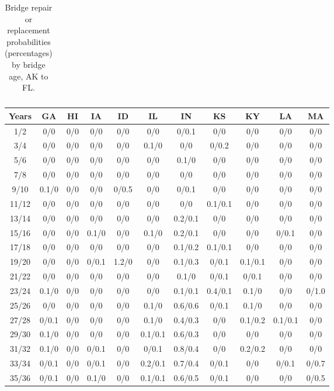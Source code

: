 \begin{table*}[htb]
\begin{tabular}{|c| c c c c c c c c c c |}
    \end{tabular}
    \caption{Bridge repair or replacement probabilities (percentages) by bridge age, AK to FL.}
    \label{table:states0}
\end{table*}
    

\begin{table*}[htb]
\footnotesize
    \centering
    \begin{tabular}{|c| c c c c c c c c c c |}\hline
        \textbf{Years} & \textbf{GA}& \textbf{HI}& \textbf{IA}& \textbf{ID}& \textbf{IL}& \textbf{IN}& \textbf{KS}& \textbf{KY}& \textbf{LA}& \textbf{MA} \\\hline
    1/2&0/0& 0/0& 0/0& 0/0& 0/0& 0/0.1& 0/0& 0/0& 0/0& 0/0\\\hline
3/4&0/0& 0/0& 0/0& 0/0& 0.1/0& 0/0& 0/0.2& 0/0& 0/0& 0/0\\\hline
5/6&0/0& 0/0& 0/0& 0/0& 0/0& 0.1/0& 0/0& 0/0& 0/0& 0/0\\\hline
7/8&0/0& 0/0& 0/0& 0/0& 0/0& 0/0& 0/0& 0/0& 0/0& 0/0\\\hline
9/10&0.1/0& 0/0& 0/0& 0/0.5& 0/0& 0/0.1& 0/0& 0/0& 0/0& 0/0\\\hline
11/12&0/0& 0/0& 0/0& 0/0& 0/0& 0/0& 0.1/0.1& 0/0& 0/0& 0/0\\\hline
13/14&0/0& 0/0& 0/0& 0/0& 0/0& 0.2/0.1& 0/0& 0/0& 0/0& 0/0\\\hline
15/16&0/0& 0/0& 0.1/0& 0/0& 0.1/0& 0.2/0.1& 0/0& 0/0& 0/0.1& 0/0\\\hline
17/18&0/0& 0/0& 0/0& 0/0& 0/0& 0.1/0.2& 0.1/0.1& 0/0& 0/0& 0/0\\\hline
19/20&0/0& 0/0& 0/0.1& 1.2/0& 0/0& 0.1/0.3& 0/0.1& 0.1/0.1& 0/0& 0/0\\\hline
21/22&0/0& 0/0& 0/0& 0/0& 0/0& 0.1/0& 0/0.1& 0/0.1& 0/0& 0/0\\\hline
23/24&0.1/0& 0/0& 0/0& 0/0& 0/0& 0.1/0.1& 0.4/0.1& 0.1/0& 0/0& 0/1.0\\\hline
25/26&0/0& 0/0& 0/0& 0/0& 0.1/0& 0.6/0.6& 0/0.1& 0.1/0& 0/0& 0/0\\\hline
27/28&0/0.1& 0/0& 0/0& 0/0& 0.1/0& 0.4/0.3& 0/0& 0.1/0.2& 0.1/0.1& 0/0\\\hline
29/30&0.1/0& 0/0& 0/0& 0/0& 0.1/0.1& 0.6/0.3& 0/0& 0/0& 0/0& 0/0\\\hline
31/32&0.1/0& 0/0& 0/0.1& 0/0& 0/0.1& 0.8/0.4& 0/0& 0.2/0.2& 0/0& 0/0\\\hline
33/34&0/0.1& 0/0& 0/0.1& 0/0& 0.2/0.1& 0.7/0.4& 0/0.1& 0/0& 0/0.1& 0/0.7\\\hline
35/36&0/0.1& 0/0& 0.1/0& 0/0& 0.1/0.1& 0.6/0.5& 0/0.1& 0/0& 0/0& 0/0.5\\\hline

\end{tabular}
\end{table*}
